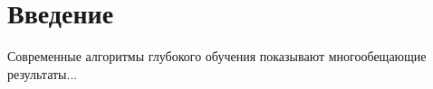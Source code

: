 \section*{Введение}

Современные алгоритмы глубокого обучения показывают многообещающие результаты...